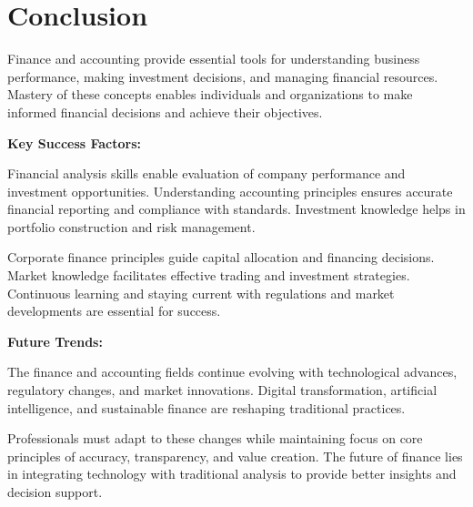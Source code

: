 \documentclass[12pt]{article}
\begin{document}
\section{Conclusion}

Finance and accounting provide essential tools for understanding business performance, making investment decisions, and managing financial resources. Mastery of these concepts enables individuals and organizations to make informed financial decisions and achieve their objectives.

\textbf{Key Success Factors:}

Financial analysis skills enable evaluation of company performance and investment opportunities. Understanding accounting principles ensures accurate financial reporting and compliance with standards. Investment knowledge helps in portfolio construction and risk management.

Corporate finance principles guide capital allocation and financing decisions. Market knowledge facilitates effective trading and investment strategies. Continuous learning and staying current with regulations and market developments are essential for success.

\textbf{Future Trends:}

The finance and accounting fields continue evolving with technological advances, regulatory changes, and market innovations. Digital transformation, artificial intelligence, and sustainable finance are reshaping traditional practices.

Professionals must adapt to these changes while maintaining focus on core principles of accuracy, transparency, and value creation. The future of finance lies in integrating technology with traditional analysis to provide better insights and decision support.
\end{document}
